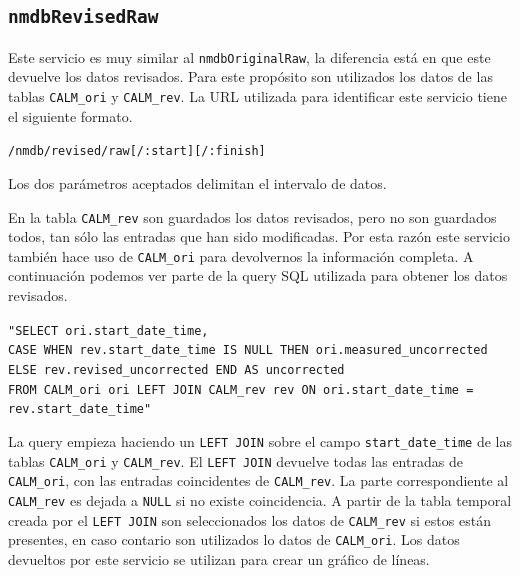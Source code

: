 	\subsection{\texttt{nmdbRevisedRaw}}
		Este servicio es muy similar al \texttt{nmdbOriginalRaw}, la diferencia está en que este devuelve los datos revisados. Para este
		propósito son utilizados los datos de las tablas \texttt{CALM\_ori} y \texttt{CALM\_rev}. La URL utilizada para identificar este
		servicio tiene el siguiente formato.
	  		\begin{center} \texttt{/nmdb/revised/raw[/:start][/:finish]}  \end{center} 
		Los dos parámetros aceptados delimitan el intervalo de datos.
		\par
		En la tabla \texttt{CALM\_rev} son guardados los datos revisados, pero no son guardados todos, tan sólo las entradas que han sido
		modificadas. Por esta razón este servicio también hace uso de \texttt{CALM\_ori} para devolvernos la información completa. A
		continuación podemos ver parte de la query SQL utilizada para obtener los datos revisados.
			\begin{center} \texttt{"SELECT ori.start\_date\_time,
			  		\\	CASE WHEN rev.start\_date\_time IS NULL THEN ori.measured\_uncorrected ELSE rev.revised\_uncorrected END AS uncorrected 
					\\	FROM CALM\_ori ori LEFT JOIN CALM\_rev rev ON ori.start\_date\_time = rev.start\_date\_time"}
			\end{center} 
		La query empieza haciendo un \texttt{LEFT JOIN} sobre el campo \texttt{start\_date\_time} de las tablas \texttt{CALM\_ori} y
		\texttt{CALM\_rev}. El \texttt{LEFT JOIN} devuelve todas las entradas de \texttt{CALM\_ori}, con las entradas coincidentes de
		\texttt{CALM\_rev}. La parte correspondiente al \texttt{CALM\_rev} es dejada a \texttt{NULL} si no existe coincidencia. A partir de la
		tabla temporal creada por el \texttt{LEFT JOIN} son seleccionados los datos de \texttt{CALM\_rev} si estos están presentes, en caso
		contario son utilizados lo datos de \texttt{CALM\_ori}. Los datos devueltos por este servicio se utilizan para crear un gráfico
		de líneas.

